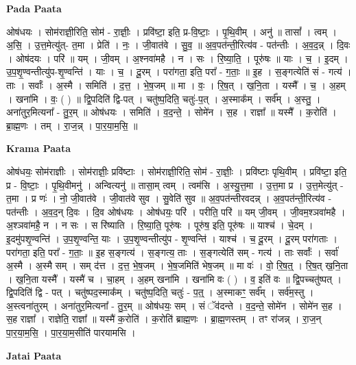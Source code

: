 \documentclass[17pt]{extarticle}
\begin{document}
\textbf{Pada Paata} \newline

ओष॑धयः । सोम॑राज्ञी॒रिति॒ सोम॑ - रा॒ज्ञीः॒ । प्रवि॑ष्टा॒ इति॒ प्र-वि॒ष्टाः॒ । पृ॒थि॒वीम् । अनु॑ ॥ तासां᳚ । त्वम् । अ॒सि॒ । उ॒त्त॒मेत्यु॑त्- त॒मा । प्रेति॑ । नः॒ । जी॒वात॑वे । सु॒व॒ ॥ अ॒व॒पत॑न्ती॒रित्य॑व - पत॑न्तीः । अ॒व॒द॒न्न् । दि॒वः । ओष॑दयः । परि॑ ॥ यम् । जी॒वम् । अ॒श्नवा॑महै । न । सः । रि॒ष्या॒ति॒ । पूरु॑षः ॥ याः । च॒ । इ॒दम् । उ॒प॒शृ॒ण्वन्तीत्यु॑प-शृ॒ण्वन्ति॑ । याः । च॒ । दू॒रम् । परा॑गता॒ इति॒ परा᳚ - ग॒ताः॒ ॥ इ॒ह । स॒ङ्गत्येति॑ सं - गत्य॑ । ताः । सर्वाः᳚ । अ॒स्मै । समिति॑ । द॒त्त॒ । भे॒ष॒जम् ॥ मा । वः॒ । रि॒ष॒त् । ख॒नि॒ता । यस्मै᳚ । च॒ । अ॒हम् । खना॑मि । वः॒ ( ) ॥ द्वि॒पदिति॑ द्वि-पत् । चतु॑ष्प॒दिति॒ चतुः॑-प॒त् । अ॒स्माक᳚म् । सर्व᳚म् । अ॒स्तु॒ । अना॑तुर॒मित्यना᳚ - तु॒र॒म् ॥ ओष॑धयः । समिति॑ । व॒द॒न्ते॒ । सोमे॑न । स॒ह । राज्ञा᳚ ॥ यस्मै᳚ । क॒रोति॑ । ब्रा॒ह्म॒णः । तम् । रा॒ज॒न्न् । पा॒र॒या॒म॒सि॒ ॥  \newline


\textbf{Krama Paata} \newline

ओष॑धयः॒ सोम॑राज्ञीः । सोम॑राज्ञीः॒ प्रवि॑ष्टाः । सोम॑राज्ञी॒रिति॒ सोम॑ - रा॒ज्ञीः॒ । प्रवि॑ष्टाः पृथि॒वीम् । प्रवि॑ष्टा॒ इति॒ प्र - वि॒ष्टाः॒ । पृ॒थि॒वीमनु॑ । अन्वित्यनु॑ ॥ तासा॒म् त्वम् । त्वम॑सि । अ॒स्यु॒त्त॒मा । उ॒त्त॒मा प्र । उ॒त्त॒मेत्यु॑त् - त॒मा । प्र णः॑ । नो॒ जी॒वात॑वे । जी॒वात॑वे सुव । सु॒वेति॑ सुव ॥ अ॒व॒पत॑न्तीरवदन्न् । अ॒व॒पत॑न्ती॒रित्य॑व - पत॑न्तीः । अ॒व॒द॒न् दि॒वः । दि॒व ओष॑धयः । ओष॑धयः॒ परि॑ । परीति॒ परि॑ ॥ यम् जी॒वम् । जी॒वम॒श्ञवा॑महै । अ॒श्ञवा॑महै॒ न । न सः । स रि॑ष्याति । रि॒ष्या॒ति॒ पूरु॑षः । पूरु॑ष॒ इति॒ पूरु॑षः ॥ याश्च॑ । चे॒दम् । इ॒दमु॑पशृ॒ण्वन्ति॑ । उ॒प॒शृ॒ण्वन्ति॒ याः । उ॒प॒शृ॒ण्वन्तीत्यु॑प - शृ॒ण्वन्ति॑ । याश्च॑ । च॒ दू॒रम् । दू॒रम् परा॑गताः । परा॑गता॒ इति॒ परा᳚ - ग॒ताः॒ ॥ इ॒ह स॒ङ्गत्य॑ । स॒ङ्गत्य॒ ताः । स॒ङ्गत्येति॑ सम् - गत्य॑ । ताः सर्वाः᳚ । सर्वा॑ अ॒स्मै । अ॒स्मै सम् । सम् द॑त्त । द॒त्त॒ भे॒ष॒जम् । भे॒ष॒जमिति॑ भेष॒जम् ॥ मा वः॑ । वो॒ रि॒ष॒त्॒ । रि॒ष॒त् ख॒नि॒ता । ख॒नि॒ता यस्मै᳚ । यस्मै॑ च । चा॒हम् । अ॒हम् खना॑मि । खना॑मि वः ( ) । व॒ इति॑ वः ॥ द्वि॒पच्चतु॑ष्पत् । द्वि॒पदिति॑ द्वि - पत् । चतु॑ष्पद॒स्माक᳚म् । चतु॑ष्प॒दिति॒ चतुः॑ - प॒त्॒ । अ॒स्माकꣳ॒॒ सर्व᳚म् । सर्व॑म॒स्तु । अ॒स्त्वना॑तुरम् । अना॑तुर॒मित्यना᳚ - तु॒र॒म् ॥ ओष॑धयः॒ सम् । सं ॅव॑दन्ते । व॒द॒न्ते॒ सोमे॑न । सोमे॑न स॒ह । स॒ह राज्ञा᳚ । राज्ञेति॒ राज्ञा᳚ ॥ यस्मै॑ क॒रोति॑ । क॒रोति॑ ब्राह्म॒णः । ब्रा॒ह्म॒णस्तम् । तꣳ रा॑जन्न् । रा॒ज॒न् पा॒र॒या॒म॒सि॒ । पा॒र॒या॒म॒सीति॑ पारयामसि । \newline

\textbf{Jatai Paata} \newline
\end{document}
